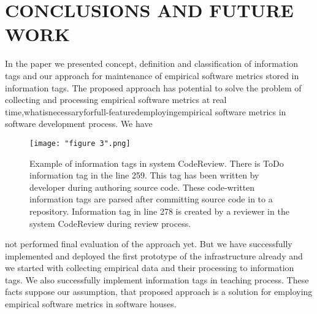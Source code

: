 \documentclass[18px,a4, conference]{IEEEtran}
\begin{document}
\section{CONCLUSIONS AND FUTURE WORK} 
\label{sec:CONCLUSIONS AND FUTURE WORK}
In the paper we presented concept, deﬁnition and classiﬁcation of information tags and our approach for maintenance of empirical software metrics stored in information tags. The proposed approach has potential to solve the problem of collecting and processing empirical software metrics at real time,whatisnecessaryforfull-featuredemployingempirical software metrics in software development process. We have



\begin{figure*} 																%
  \begin{minipage}[c]{.9\linewidth}
    \null
    \texttt{[image: "figure 3".png]}
  \end{minipage}\hfill
  \begin{minipage}[c]{\textwidth}
    \caption{Example of information tags in system CodeReview. There is ToDo information tag in the line 259. This tag has been written by developer during authoring source code. These code-written information tags are parsed after committing source code in to a repository. Information tag in line 278 is created by a reviewer in the system CodeReview during review process.}
    \label{fig:Figure 3}
  \end{minipage}
\end{figure*}
not performed ﬁnal evaluation of the approach yet. But we have successfully implemented and deployed the ﬁrst prototype of the infrastructure already and we started with collecting empirical data and their processing to information tags. We also successfully implement information tags in teaching process. These facts suppose our assumption, that proposed approach is a solution for employing empirical software metrics in software houses.
\end{document}
